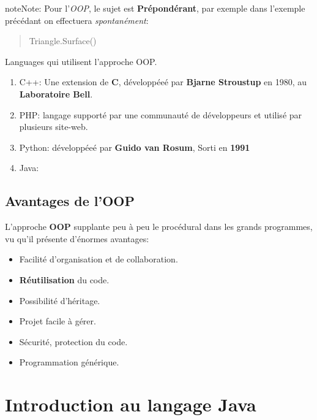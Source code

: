 \documentclass[letterpaper,10pt,english]{sphinxmanual}
\begin{document}
\begin{notice}{note}{Note:}
Pour l'\emph{OOP}, le sujet est \textbf{Prépondérant}, par exemple dans l'exemple précédant on effectuera \emph{spontanément}:
\begin{quote}

Triangle.Surface()
\end{quote}
\end{notice}

Languages qui utilisent l'approche OOP.
\begin{enumerate}
\item {} 
C++: Une extension de \textbf{C}, développéeé par \textbf{Bjarne Stroustup} en 1980, au \textbf{Laboratoire Bell}.

\item {} 
PHP: langage supporté par une communauté de développeurs et utilisé par plusieurs site-web.

\item {} 
Python: développéeé par \textbf{Guido van Rosum}, Sorti en \textbf{1991}

\item {} 
Java:

\end{enumerate}


\subsection{Avantages de l'OOP}
\label{oriente_objet:avantages-de-l-oop}
L'approche \textbf{OOP} supplante peu à peu le procédural dans les grands programmes, vu qu'il présente d'énormes avantages:
\begin{itemize}
\item {} 
Facilité d'organisation et de collaboration.

\item {} 
\textbf{Réutilisation} du code.

\item {} 
Possibilité d'héritage.

\item {} 
Projet facile à gérer.

\item {} 
Sécurité, protection du code.

\item {} 
Programmation générique.

\end{itemize}


\section{Introduction au langage Java}
\label{java:java}\label{java:introduction-au-langage-java}\label{java::doc}
\end{document}
